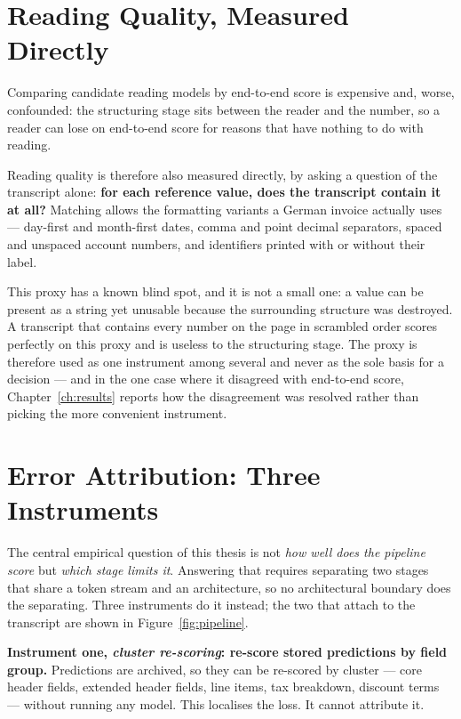 \section{Reading Quality, Measured Directly}
\label{sec:method-answerability}

Comparing candidate reading models by end-to-end score is expensive and, worse, confounded:
the structuring stage sits between the reader and the number, so a reader can lose on
end-to-end score for reasons that have nothing to do with reading.

Reading quality is therefore also measured directly, by asking a question of the transcript
alone: \textbf{for each reference value, does the transcript contain it at all?} Matching
allows the formatting variants a German invoice actually uses --- day-first and
month-first dates, comma and point decimal separators, spaced and unspaced account numbers,
and identifiers printed with or without their label.

This proxy has a known blind spot, and it is not a small one: a value can be present as a
string yet unusable because the surrounding structure was destroyed. A transcript that
contains every number on the page in scrambled order scores perfectly on this proxy and is
useless to the structuring stage. The proxy is therefore used as one instrument among several
and never as the sole basis for a decision --- and in the one case where it disagreed with
end-to-end score, Chapter~\ref{ch:results} reports how the disagreement was resolved rather
than picking the more convenient instrument.

\section{Error Attribution: Three Instruments}
\label{sec:method-attribution}

The central empirical question of this thesis is not \emph{how well does the pipeline score}
but \emph{which stage limits it}. Answering that requires separating two stages that share a
token stream and an architecture, so no architectural boundary does the separating.
Three instruments do it instead; the two that attach to the transcript are shown in
Figure~\ref{fig:pipeline}.

\textbf{Instrument one, \emph{cluster re-scoring}: re-score stored predictions by field
group.} Predictions are archived,
so they can be re-scored by cluster --- core header fields, extended header fields, line
items, tax breakdown, discount terms --- without running any model. This localises the loss.
It cannot attribute it.

